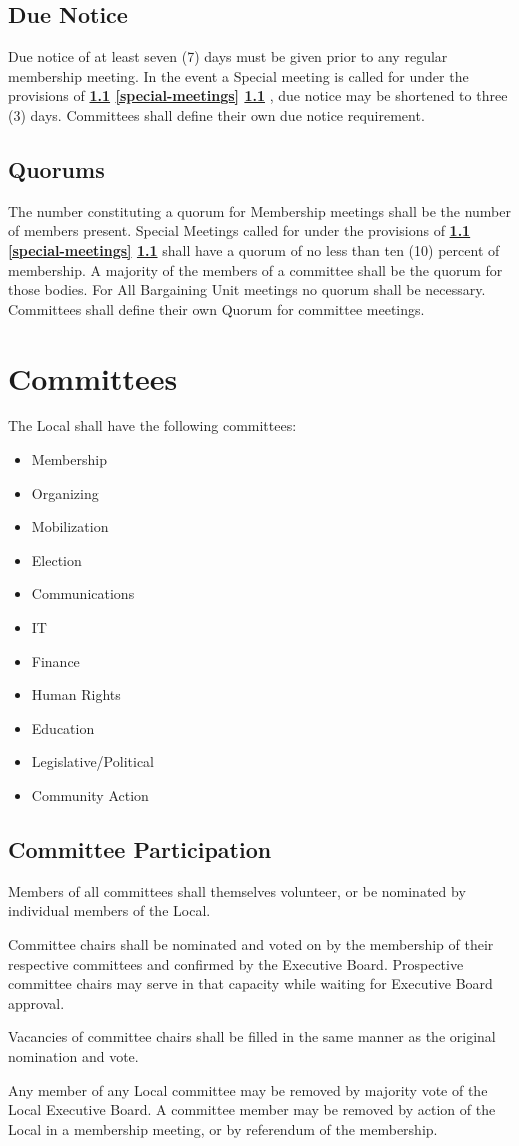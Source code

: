 \documentclass[11pt]{article}
\newcommand{\article}[1]{\vspace{.50cm}\section{#1}}
\newcommand{\articlesection}[1]{\vspace{.25cm}\subsection{#1}}
\newcommand{\fullref}[3]{%
  \textbf{%
    \ifthenelse{\isempty{#1}}%
    {}%
    {\ref{#1}}%
    \ifthenelse{\isempty{#2}}%
    {}%
    {%
      \ifthenelse{\isempty{#1}}{}{, }%
      \ref{#2}%
    }%
    \ifthenelse{\isempty{#3}}%
    {}%
    {\ref{#3}}%
  }%
}
\begin{document}
\articlesection{Due Notice}
Due notice of at least seven (7) days must be given prior to any regular membership meeting. In the event a Special meeting is called for under the provisions of \fullref{}{special-meetings}{}, due notice may be shortened to three (3) days. Committees shall define their own due notice requirement.

\articlesection{Quorums}
The number constituting a quorum for Membership meetings shall be the number of members present. Special Meetings called for under the provisions of \fullref{}{special-meetings}{} shall have a quorum of no less than ten (10) percent of membership. A majority of the members of a committee shall be the quorum for those bodies. For All Bargaining Unit meetings no quorum shall be necessary. Committees shall define their own Quorum for committee meetings.

\article{Committees}\label{committees}
The Local shall have the following committees:
\begin{itemize}
\item Membership
\item Organizing
\item Mobilization
\item Election
\item Communications
\item IT
\item Finance
\item Human Rights
\item Education
\item Legislative/Political
\item Community Action
\end{itemize}

\articlesection{Committee Participation}
\begin{paralist}
\item Members of all committees shall themselves volunteer, or be nominated by individual members of the Local.
\item Committee chairs shall be nominated and voted on by the membership of their respective committees and confirmed by the Executive Board. Prospective committee chairs may serve in that capacity while waiting for Executive Board approval.
\item Vacancies of committee chairs shall be filled in the same manner as the original nomination and vote.
  \item Any member of any Local committee may be removed by majority vote of the Local Executive Board. A committee member may be removed by action of the Local in a membership meeting, or by referendum of the membership.
\end{paralist}
\end{document}
